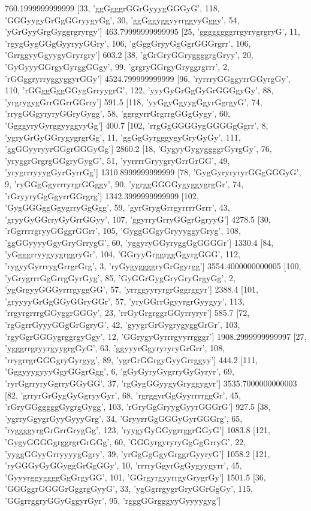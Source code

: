 760.1999999999999 [33, 'ggGgggrGGrGyyygGGGyG', 118, 'GGGyygyGrGgGGryygyGg', 30, 'ggGggyggyyrrggyyGggy', 54, 'yGrGyyGrgGyggrgryrgy']
463.79999999999995 [25, 'ggggggggrrgyrygrgryG', 11, 'rgygGygGGgGyyryyGGry', 106, 'gGggGryyGgGgrGGGrgrr', 106, 'GrrggyyGgyygyGryrgry']
603.2 [38, 'gGrGryGGryggggrgGryy', 20, 'GyGyyyGGrgyGyrggGGgy', 99, 'grgryGGrgyGryggrgrrr', 2, 'rGGggryrryggyggyrGGy']
4524.799999999999 [96, 'ryrrryGGggyrrGGyrgGy', 110, 'rGGggGggGGygGrryygrG', 122, 'yyyGyGrGgGyGrGGGgyGy', 88, 'yrgrygygGrrGGrrGGrry']
591.5 [118, 'yyGgyGgyygGgyrGgrgyG', 74, 'rrygGGgyryryGGryGygg', 58, 'ggrgyrrGrgrrgGGgGygy', 60, 'GgggyryGyrggyyggyyGg']
400.7 [102, 'rrgGgGGGGygGGGGgGgrr', 8, 'ygryGrGyGGrygygrgrGg', 11, 'ggGgGyrgggygyGryGyGy', 111, 'ggGGyyryyrGGgrGGGyGg']
2860.2 [18, 'GygyyGygyggggrGyrgGy', 76, 'yryggrGrgrgGGgryGygG', 51, 'yyrrrrGryygryGrrGrGG', 49, 'yrygrrryyygGyrGyrrGg']
1310.8999999999999 [78, 'GygGyryryryrGGgGGGyG', 9, 'ryGGgGgyrrryrgrGGggy', 90, 'ygrggGGGGygyggygrgGr', 74, 'rGryyryGgGgyrrGGrgrg']
1342.3999999999999 [102, 'GygGGGggGgygrryGgGgg', 59, 'gyrGrygGrrgyrrrrGrrr', 43, 'gryyGyGGrryGyGrrGGyy', 107, 'ggyrryGrryGGgrGgryyG']
4278.5 [30, 'rGgrrrrgryyGGggrGGrr', 105, 'GyggGGgyGryyyggyGryg', 108, 'ggGGyyyyGgyGryGrrygG', 60, 'yggyryGGyryggGgGGGGr']
1330.4 [84, 'yGgggrryygyygrggryGr', 104, 'GGryyGrggrggGgyrgGGG', 112, 'rygyyGyrrrygGrrgrGrg', 3, 'ryGygyggggryGrGgyrgg']
3554.4000000000005 [100, 'yGrygrrrGgGrrgGyrGyg', 85, 'GyGGrGygGryGryGrgyGg', 2, 'ygGrgyyGGGyrrrgyggGG', 57, 'yrrggyyryrgrGggrggyr']
2388.4 [101, 'gryyyyGrGgGGyGGryGGr', 57, 'yryGGrrGgyyrgrGyygyy', 113, 'rrgyrgrrrgGGyggrGGGy', 23, 'rrGyGrgrggrGGyrryryr']
585.7 [72, 'rgGgrrGyyyGGgGrGgryG', 42, 'gyygrGrGygrygyggGrGr', 103, 'rgyGgrGGGygrggrgyGgy', 12, 'GGrygyGyrrrgyyrrgggr']
1908.2999999999997 [27, 'ygggrrgryyrgyygrgGyG', 63, 'ggyyyrGgyryryryGrGrr', 108, 'rrygrrgrGGGgryGyrgyg', 89, 'ygrGrGGrgyGyyGrrggyy']
444.2 [111, 'GggyyygyyyGgyGGgrGgg', 6, 'gGyGyryGygrryGyGyryr', 69, 'ryrGgrryryGgrryGGyGG', 37, 'rgGygGGyygyGryggygyr']
3535.7000000000003 [82, 'grryrGrGygGyGgryyGyr', 68, 'rgrggyrGgGyyrrrrggGr', 45, 'rGryGGgggggGygrgGygg', 103, 'rGryGgGryygGyyrGGGrG']
927.5 [38, 'ygrryGgygrGyyGyyyGrg', 34, 'GryyrrGgGGGyGyrGGGrg', 65, 'ryggggyrgGrGrrGrygGg', 123, 'ryygyGyGGygrrggrGGyG']
1083.8 [121, 'GygyGGGGgrggrgrGrGGg', 60, 'GGGyrgyryryGgGgGrryG', 22, 'yyggGGyyGrryyyygGgry', 39, 'yrGgGgGgyGrggrGyyryG']
1058.2 [121, 'ryGGGyGyGGyggGrGgGGy', 10, 'rrrryGgyrGgGygyygyrr', 45, 'GyyyrggyggggGgGrgyGG', 101, 'GGrgyrgyyrrgyGrygrGy']
1501.5 [36, 'GGGggrGGGGrGggrgGyyG', 33, 'ygGgrrgygrGryGGrGgGy', 115, 'GGgrrggryGGyGggyrGyr', 95, 'rgggGGrgggyyGyyyygyg']
